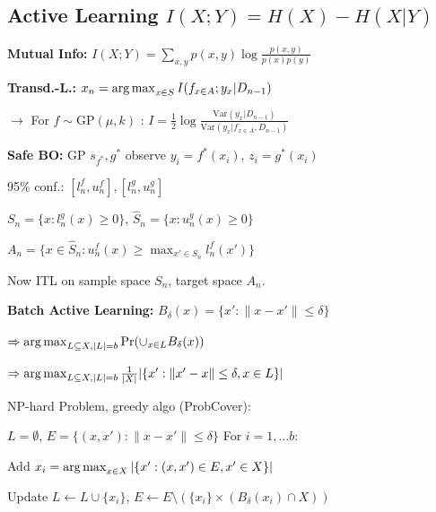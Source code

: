 \subsection{Active Learning \quad \scriptsize$I(X;Y) = H(X) - H(X|Y)$}



\textbf{Mutual Info:} $I(X;Y) = \sum_{x,y} p(x,y) \log \frac{p(x,y)}{p(x)p(y)}$

\textbf{Transd.-L.:} $x_n = \operatorname{arg\,max}_{x \in S} I(f_{x \in A}; y_x | D_{n-1})$

$\to$ For $f \sim \text{GP}(\mu,k)$ : $I = \frac{1}{2}\log \frac{\text{Var}(y_x|D_{n-1})}{\text{Var}(y_x|f_{x \in A}, D_{n-1})}$

\textbf{Safe BO:} GP $s_{f^*}, g^*$ observe $y_i = f^*(x_i)$, $z_i = g^*(x_i)$

95\% conf.: $[l_n^f, u_n^f], [l_n^g, u_n^g]$

$S_n = \{x : l_n^g(x) \geq 0\}$, $\hat{S}_n = \{x : u_n^g(x) \geq 0\}$

$A_n = \{x \in \hat{S}_n : u_n^f(x) \geq \max_{x' \in S_n} l_n^f(x')\}$

Now ITL on sample space $S_n$, target space $A_n$.

\textbf{Batch Active Learning:} $B_\delta(x) = \{x' : \|x - x'\| \leq \delta\}$

$\Rightarrow \operatorname{arg\,max}_{L \subseteq X, |L|=b} \Pr(\cup_{x \in L} B_\delta(x))$

$\Rightarrow \operatorname{arg\,max}_{L \subseteq X, |L|=b} \frac{1}{|X|}|\{x' : \|x' - x\| \leq \delta, x \in L\}|$

NP-hard Problem, greedy algo (ProbCover):

$L = \emptyset$, $E = \{(x, x') : \|x - x'\| \leq \delta\}$ For $i = 1, \ldots b$:

Add $x_i = \operatorname{arg\,max}_{x \in X} |\{x' : (x, x') \in E, x' \in X\}|$

Update $L \leftarrow L \cup \{x_i\}$, $E \leftarrow E \setminus (\{x_i\} \times (B_\delta(x_i) \cap X))$


